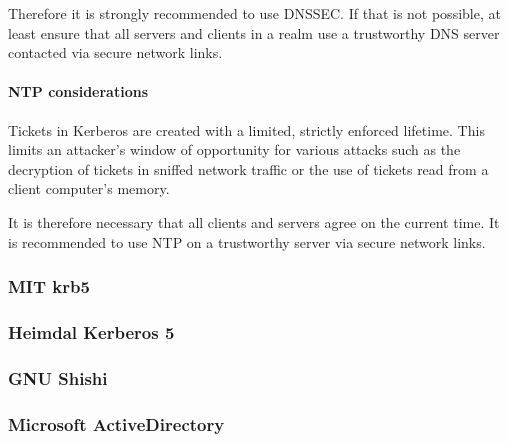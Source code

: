 Therefore it is strongly recommended to use DNSSEC.  If that is not possible, at least ensure that all servers and clients in a realm use a trustworthy DNS server contacted via secure network links.

\paragraph{NTP considerations}
Tickets in Kerberos are created with a limited, strictly enforced lifetime. This limits an attacker's window of opportunity for various attacks such as the decryption of tickets in sniffed network traffic or the use of tickets read from a client computer's memory.

It is therefore necessary that all clients and servers agree on the current time. It is recommended to use NTP on a trustworthy server via secure network links. 

\subsubsection{MIT krb5}

\subsubsection{Heimdal Kerberos 5}

\subsubsection{GNU Shishi}

\subsubsection{Microsoft ActiveDirectory}
